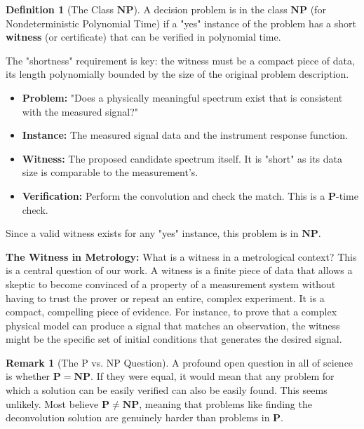 \documentclass[12pt]{article}
\theoremstyle{definition}
\newtheorem{definition}{Definition}[section]
\newtheorem{remark}{Remark}[section]
\begin{document}
\begin{definition}[The Class $\mathbf{NP}$]
A decision problem is in the class $\mathbf{NP}$ (for Nondeterministic Polynomial Time) if a "yes" instance of the problem has a short \textbf{witness} (or certificate) that can be verified in polynomial time.
\end{definition}

The "shortness" requirement is key: the witness must be a compact piece of data, its length polynomially bounded by the size of the original problem description.

\begin{itemize}
    \item \textbf{Problem:} "Does a physically meaningful spectrum exist that is consistent with the measured signal?"
    \item \textbf{Instance:} The measured signal data and the instrument response function.
    \item \textbf{Witness:} The proposed candidate spectrum itself. It is "short" as its data size is comparable to the measurement's.
    \item \textbf{Verification:} Perform the convolution and check the match. This is a $\mathbf{P}$-time check.
\end{itemize}
Since a valid witness exists for any "yes" instance, this problem is in $\mathbf{NP}$.

\textbf{The Witness in Metrology:} What is a witness in a metrological context? This is a central question of our work. A witness is a finite piece of data that allows a skeptic to become convinced of a property of a measurement system without having to trust the prover or repeat an entire, complex experiment. It is a compact, compelling piece of evidence. For instance, to prove that a complex physical model can produce a signal that matches an observation, the witness might be the specific set of initial conditions that generates the desired signal.

\begin{remark}[The P vs. NP Question]
A profound open question in all of science is whether $\mathbf{P} = \mathbf{NP}$. If they were equal, it would mean that any problem for which a solution can be easily verified can also be easily found. This seems unlikely. Most believe $\mathbf{P} \neq \mathbf{NP}$, meaning that problems like finding the deconvolution solution are genuinely harder than problems in $\mathbf{P}$.
\end{remark}
\end{document}
